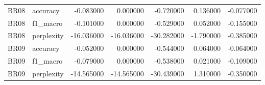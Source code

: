 \begin{tabular}{llrrrrr}
BR08 & accuracy & -0.083000 & 0.000000 & -0.720000 & 0.136000 & -0.077000 \\
BR08 & f1_macro & -0.101000 & 0.000000 & -0.529000 & 0.052000 & -0.155000 \\
BR08 & perplexity & -16.036000 & -16.036000 & -30.282000 & -1.790000 & -0.385000 \\
BR09 & accuracy & -0.052000 & 0.000000 & -0.544000 & 0.064000 & -0.064000 \\
BR09 & f1_macro & -0.079000 & 0.000000 & -0.538000 & 0.021000 & -0.109000 \\
BR09 & perplexity & -14.565000 & -14.565000 & -30.439000 & 1.310000 & -0.350000 \\
\bottomrule
\end{tabular}
